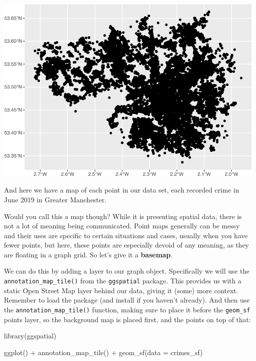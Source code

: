 \documentclass[
]{book}
\newenvironment{Shaded}{\begin{snugshade}}{\end{snugshade}}
\newcommand{\AttributeTok}[1]{\textcolor[rgb]{0.77,0.63,0.00}{#1}}
\newcommand{\FunctionTok}[1]{\textcolor[rgb]{0.00,0.00,0.00}{#1}}
\newcommand{\NormalTok}[1]{#1}
\newcommand{\SpecialCharTok}[1]{\textcolor[rgb]{0.00,0.00,0.00}{#1}}
\begin{document}
\includegraphics{crime_mapping_files/figure-latex/unnamed-chunk-14-1.pdf}

And here we have a map of each point in our data set, each recorded crime in June 2019 in Greater Manchester.

Would you call this a map though? While it is presenting spatial data, there is not a lot of meaning being communicated. Point maps generally can be messy and their uses are specific to certain situations and cases, usually when you have fewer points, but here, these points are especially devoid of any meaning, as they are floating in a graph grid. So let's give it a \textbf{basemap}.

We can do this by adding a layer to our graph object. Specifically we will use the \texttt{annotation\_map\_tile()} from the \texttt{ggspatial} package. This provides us with a static Open Street Map layer behind our data, giving it (some) more context. Remember to load the package (and install if you haven't already). And then use the \texttt{annotation\_map\_tile()} function, making sure to place it before the \texttt{geom\_sf} points layer, so the background map is placed first, and the points on top of that:

\begin{Shaded}
\begin{Highlighting}[]
\FunctionTok{library}\NormalTok{(ggspatial)}

\FunctionTok{ggplot}\NormalTok{() }\SpecialCharTok{+} 
 \FunctionTok{annotation\_map\_tile}\NormalTok{() }\SpecialCharTok{+}
  \FunctionTok{geom\_sf}\NormalTok{(}\AttributeTok{data =}\NormalTok{ crimes\_sf)}
\end{Highlighting}
\end{Shaded}
\end{document}
